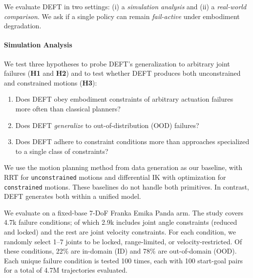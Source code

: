 We evaluate DEFT in two settings: (i) a \emph{simulation analysis} and (ii) a \emph{real-world comparison}. We ask if a single policy can remain \emph{fail-active} under embodiment degradation.

\paragraph{Simulation Analysis}
We test three hypotheses to probe DEFT's generalization to arbitrary joint failures (\textbf{H1} and \textbf{H2}) and to test whether DEFT produces both unconstrained and constrained motions (\textbf{H3}):
\begin{enumerate}
\item[\textbf{H.1}] Does DEFT obey embodiment constraints of arbitrary actuation failures more often than classical planners?
\item[\textbf{H.2}] Does DEFT \emph{generalize} to out-of-distribution (OOD) failures?
\item[\textbf{H.3}] Does DEFT adhere to constraint conditions more than approaches specialized to a single class of constraints?
\end{enumerate}

We use the motion planning method from data generation as our baseline, with RRT for \texttt{unconstrained} motions and differential IK with optimization for \texttt{constrained} motions. These baselines do not handle both primitives. In contrast, \textsc{DEFT} generates both within a unified model.

We evaluate on a fixed-base 7-DoF Franka Emika Panda arm. The study covers 4.7k failure conditions; of which 2.9k includes joint angle constraints (reduced and locked) and the rest are joint velocity constraints. For each condition, we randomly select 1--7 joints to be locked, range-limited, or velocity-restricted. Of these conditions, 22\% are in-domain (ID) and 78\% are out-of-domain (OOD). Each unique failure condition is tested 100 times, each with 100 start-goal pairs for a total of 4.7M trajectories evaluated.

